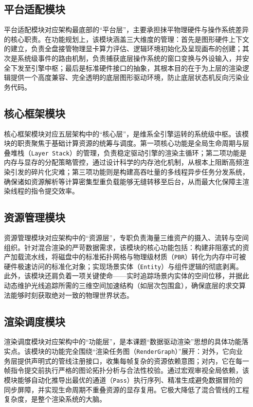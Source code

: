 \subsection{平台适配模块}
平台适配模块对应架构最底部的“平台层”，主要承担抹平物理硬件与操作系统差异的核心职责。在功能规划上，该模块涵盖三大维度的管理：首先是图形硬件上下文的建立，负责全盘接管物理显卡算力评估、逻辑环境初始化及呈现画布的创建；其次是系统级事件的路由机制，负责捕获底层操作系统的窗口变换与外设输入，并安全下发至引擎中枢；最后是标准硬件接口的抽象，其根本目的在于为上层的渲染逻辑提供一个高度兼容、完全透明的底层图形驱动环境，防止底层状态机反向污染业务代码。

\subsection{核心框架模块}
核心框架模块对应五层架构中的“核心层”，是维系全引擎运转的系统级中枢。该模块的职责聚焦于基础计算资源的统筹与调度。第一项核心功能是全局生命周期与层叠堆栈（\texttt{Layer Stack}）的管理，负责稳定驱动引擎的渲染主循环；第二项功能是内存与显存的分配策略管控，通过设计科学的内存池化机制，从根本上阻断高频渲染引发的碎片化灾难；第三项功能则是构建高吞吐量的多线程异步任务分发系统，确保诸如资源解析等计算密集型重负载能够无缝转移至后台，从而最大化保障主渲染线程的指令提交效率。

\subsection{资源管理模块}
资源管理模块对应架构中的“资源层”，专职负责海量三维资产的摄入、流转与空间组织。针对混合渲染的严苛数据需求，该模块的核心功能包括：构建非阻塞式的资产加载流水线，将磁盘中的标准拓扑网格与物理级材质（\texttt{PBR}）转化为内存中可被硬件极速访问的标准化对象；实现场景实体（\texttt{Entity}）与组件逻辑的彻底剥离。此外，该模块还肩负着一项关键使命——实时追踪场景内实体的空间位移，并据此动态维护光线追踪所需的三维空间加速结构（如层次包围盒），确保底层的求交算法能够时刻获取绝对一致的物理世界状态。

\subsection{渲染调度模块}
渲染调度模块对应架构中的“功能层”，是本课题“数据驱动渲染”思想的具体功能落实点。该模块的功能完全围绕“渲染任务图（\texttt{RenderGraph}）”展开：对外，它向业务层提供声明式的管线注册接口，收集每帧复杂的资源依赖意图；对内，它在每一帧指令提交前执行严格的图论拓扑分析与合法性校验。通过宏观审视全局依赖，该模块能够自动化推导出最优的通道（\texttt{Pass}）执行序列、精准生成避免数据冒险的同步屏障，并实现生命周期不重叠资源的显存复用。它极大降低了混合管线的工程复杂度，是整个渲染系统的大脑。

